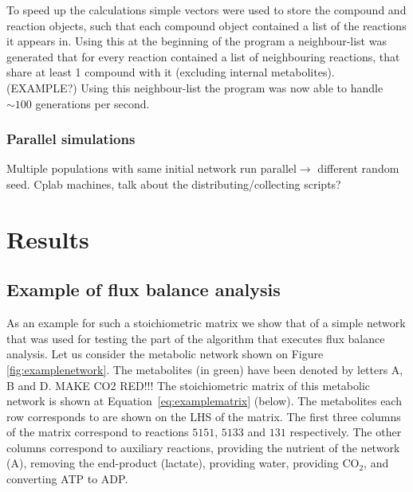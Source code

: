 \documentclass[10pt,a4paper]{article}
\begin{document}
	To speed up the calculations simple vectors were used to store the compound and reaction objects, such that each compound object contained a list of the reactions it appears in. Using this at the beginning of the program a neighbour-list was generated that for every reaction contained a list of neighbouring reactions, that share at least 1 compound with it (excluding internal metabolites). (EXAMPLE?) Using this neighbour-list the program was now able to handle $\sim 100$ generations per second. 

\subsubsection{Parallel simulations}
\label{ssub:Paralell simulations}
Multiple populations with same initial network  run parallel$\rightarrow$ different random seed. Cplab machines, talk about the distributing/collecting scripts?



\section{Results}
\label{sec:results}


\subsection{Example of flux balance analysis}
\label{sub:example_of_flux_balance_analysis}


	As an example for such a stoichiometric matrix we show that of a simple network that was used for testing the part of the algorithm that executes flux balance analysis. Let us consider the metabolic network shown on Figure \ref{fig:examplenetwork}. The metabolites (in green) have been denoted by letters A, B and D. MAKE CO2 RED!!! The stoichiometric matrix of this metabolic network is shown at Equation~\ref{eq:examplematrix} (below). The metabolites each row corresponds to are shown on the LHS of the matrix. The first three columns of the matrix correspond to reactions $5151$, $5133$ and $131$ respectively. The other columns correspond to auxiliary reactions, providing the nutrient of the network (A), removing the end-product (lactate), providing water, providing CO$_2$, and converting ATP to ADP. 
\end{document}
